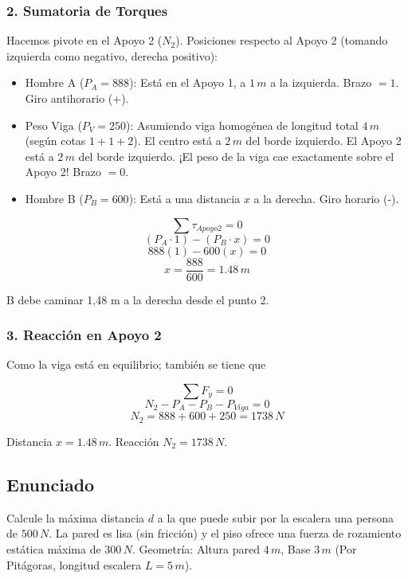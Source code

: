 \documentclass[12pt, a4paper]{article}
\begin{document}
\subsubsection*{2. Sumatoria de Torques}
Hacemos pivote en el Apoyo 2 ($N_2$).
Posiciones respecto al Apoyo 2 (tomando izquierda como negativo, derecha positivo):
\begin{itemize}
    \item Hombre A ($P_A = 888$): Está en el Apoyo 1, a $1 \, \si{m}$ a la izquierda. Brazo $= 1$. Giro antihorario (+).
    \item Peso Viga ($P_V = 250$): Asumiendo viga homogénea de longitud total $4 \, \si{m}$ (según cotas $1+1+2$). El centro está a $2 \, \si{m}$ del borde izquierdo. El Apoyo 2 está a $2 \, \si{m}$ del borde izquierdo. ¡El peso de la viga cae exactamente sobre el Apoyo 2! Brazo $= 0$.
    \item Hombre B ($P_B = 600$): Está a una distancia $x$ a la derecha. Giro horario (-).
\end{itemize}

$$ \sum \tau_{Apoyo2} = 0 $$
$$ (P_A \cdot 1) - (P_B \cdot x) = 0 $$
$$ 888(1) - 600(x) = 0 $$
$$ x = \frac{888}{600} = 1.48 \, \si{m} $$

B debe caminar 1,48 m a la derecha desde el punto 2.

\subsubsection*{3. Reacción en Apoyo 2}
Como la viga está en equilibrio; también se tiene que

$$ \sum F_y = 0 $$
$$ N_2 - P_A - P_B - P_{Viga} = 0 $$
$$ N_2 = 888 + 600 + 250 = 1738 \, \si{N} $$

\begin{tcolorbox}[colback=blue!5!white, colframe=blue!50!black, title=Respuesta]
Distancia $x = 1.48 \, \si{m}$. Reacción $N_2 = 1738 \, \si{N}$.
\end{tcolorbox}

\newpage

\subsection*{Enunciado}
Calcule la máxima distancia $d$ a la que puede subir por la escalera una persona de $500 \, \si{N}$. La pared es lisa (sin fricción) y el piso ofrece una fuerza de rozamiento estática máxima de $300 \, \si{N}$.
Geometría: Altura pared $4 \, \si{m}$, Base $3 \, \si{m}$ (Por Pitágoras, longitud escalera $L=5 \, \si{m}$).
\end{document}

